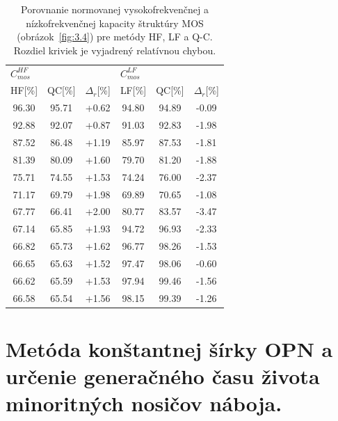 \begin{table}[h!]\centering
  \begin{tabular}{c c c c c c}
  \multicolumn{3}{l}{$C^{HF}_{mos}$} & \multicolumn{3}{l}{$C^{LF}_{mos}$} \\
  HF[\%] & QC[\%] & $\Delta_r$[\%] & LF[\%] & QC[\%] & $\Delta_r$[\%] \\
  \hline
  96.30 & 95.71 & +0.62 & 94.80 & 94.89 & -0.09 \\
  92.88 & 92.07 & +0.87 & 91.03 & 92.83 & -1.98 \\
  87.52 & 86.48 & +1.19 & 85.97 & 87.53 & -1.81 \\
  81.39 & 80.09 & +1.60 & 79.70 & 81.20 & -1.88 \\
  75.71 & 74.55 & +1.53 & 74.24 & 76.00 & -2.37 \\
  71.17 & 69.79 & +1.98 & 69.89 & 70.65 & -1.08 \\
  67.77 & 66.41 & +2.00 & 80.77 & 83.57 & -3.47 \\
  67.14 & 65.85 & +1.93 & 94.72 & 96.93 & -2.33 \\
  66.82 & 65.73 & +1.62 & 96.77 & 98.26 & -1.53 \\
  66.65 & 65.63 & +1.52 & 97.47 & 98.06 & -0.60 \\
  66.62 & 65.59 & +1.53 & 97.94 & 99.46 & -1.56 \\
  66.58 & 65.54 & +1.56 & 98.15 & 99.39 & -1.26 \\
  \end{tabular}
  \caption[Porovnanie normovanej vysokofrekvenčnej a
  nízkofrekvenčnej kapacity štruktúry MOS (obrázok~\ref{fig:3.4}) pre
  metódy HF, LF a Q-C]{Porovnanie normovanej vysokofrekvenčnej a
  nízkofrekvenčnej kapacity štruktúry MOS (obrázok~\ref{fig:3.4}) pre
  metódy HF, LF a Q-C. Rozdiel kriviek je vyjadrený relatívnou
  chybou.}\label{tab:3.2}
\end{table}

\section{Metóda konštantnej šírky OPN a určenie generačného času života minoritných nosičov náboja.}\label{sec:3.4}

